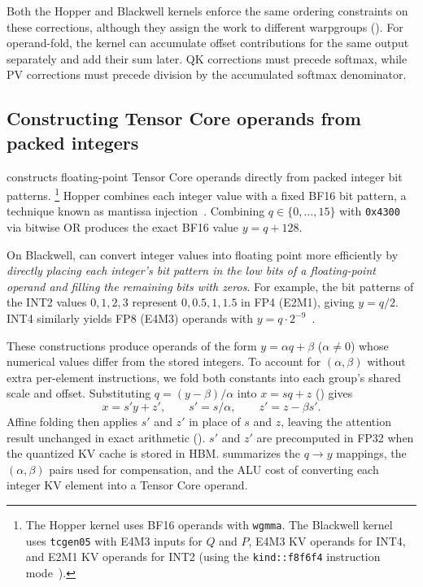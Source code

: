 Both the Hopper and Blackwell kernels enforce the same ordering constraints on these corrections, although they assign the work to different warpgroups ().
For operand-fold, the kernel can accumulate offset contributions for the same output separately and add their sum later.
QK corrections must precede softmax, while PV corrections must precede division by the accumulated softmax denominator.

\subsection{Constructing Tensor Core operands from packed integers}
\label{sec:design-unpack}

\sys{} constructs floating-point Tensor Core operands directly from packed integer bit patterns.%
\footnote{The Hopper kernel uses BF16 operands with \texttt{wgmma}.
The Blackwell kernel uses \texttt{tcgen05} with E4M3 inputs for $Q$ and $P$, E4M3 KV operands for INT4, and E2M1 KV operands for INT2 (using the \texttt{kind::f8f6f4} instruction mode~\cite{nvidia2026ptx}).}
Hopper combines each integer value with a fixed BF16 bit pattern, a technique known as mantissa injection~\cite{kim2022elephants,frantar2025marlin,du2026bitdecoding}.
Combining $q\in\{0,\ldots,15\}$ with \texttt{0x4300} via bitwise OR produces the exact BF16 value $y=q+128$.

On Blackwell, \sys{} can convert integer values into floating point more efficiently by \emph{directly placing each integer's bit pattern in the low bits of a floating-point operand and filling the remaining bits with zeros}.
For example, the bit patterns of the INT2 values $0,1,2,3$ represent $0,0.5,1,1.5$ in FP4 (E2M1), giving $y=q/2$.
INT4 similarly yields FP8 (E4M3) operands with $y=q\cdot2^{-9}$~\cite{lin2025marlinw4a8}.




These constructions produce operands of the form $y=\alpha q+\beta$ ($\alpha\ne0$) whose numerical values differ from the stored integers.
To account for $(\alpha,\beta)$ without extra per-element instructions, we fold both constants into each group's shared scale and offset.
Substituting $q=(y-\beta)/\alpha$ into $x=sq+z$ () gives
\begin{equation}
  x=s'y+z',\qquad s'=s/\alpha,\qquad z'=z-\beta s'.
  \label{eq:operand-transform}
\end{equation}
Affine folding then applies $s'$ and $z'$ in place of $s$ and $z$, leaving the attention result unchanged in exact arithmetic ().
$s'$ and $z'$ are precomputed in FP32 when the quantized KV cache is stored in HBM.
 summarizes the $q\to y$ mappings, the $(\alpha,\beta)$ pairs used for compensation, and the ALU cost of converting each integer KV element into a Tensor Core operand.


